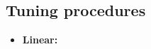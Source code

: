 \subsection{Tuning procedures}
\label{sec:rh_methods_tuning}
\begin{itemize}
\item \textbf{Linear:}
  \begin{itemize}

\end{itemize}
\end{itemize}
